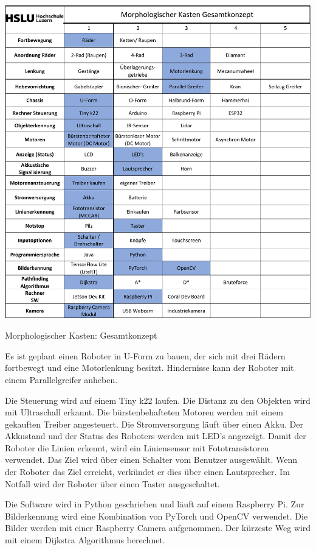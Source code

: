 \begin{table}[H]
\centering
\includegraphics[width=\textwidth -20mm]{assets/MK-all.pdf}
\caption{Morphologischer Kasten: Gesamtkonzept}
\label{table:mk-all}
\end{table}

Es ist geplant einen Roboter in U-Form zu bauen, der sich mit drei Rädern fortbewegt und eine Motorlenkung besitzt. Hindernisse kann der Roboter mit einem Parallelgreifer anheben.

Die Steuerung wird auf einem Tiny k22 laufen. Die Distanz zu den Objekten wird mit Ultraschall erkannt. Die bürstenbehafteten Motoren werden mit einem gekauften Treiber angesteuert. Die Stromversorgung läuft über einen Akku. Der Akkustand und der Status des Roboters werden mit LED's angezeigt. Damit der Roboter die Linien erkennt, wird ein Liniensensor mit Fototransistoren verwendet. Das Ziel wird über einen Schalter vom Benutzer ausgewählt.
Wenn der Roboter das Ziel erreicht, verkündet er dies über einen Lautsprecher. Im Notfall wird der Roboter über einen Taster ausgeschaltet.

Die Software wird in Python geschrieben und läuft auf einem Raspberry Pi. Zur Bilderkennung wird eine Kombination von PyTorch und OpenCV verwendet. Die Bilder werden mit einer Raspberry Camera aufgenommen. Der kürzeste Weg wird mit einem Dijkstra Algorithmus berechnet.


